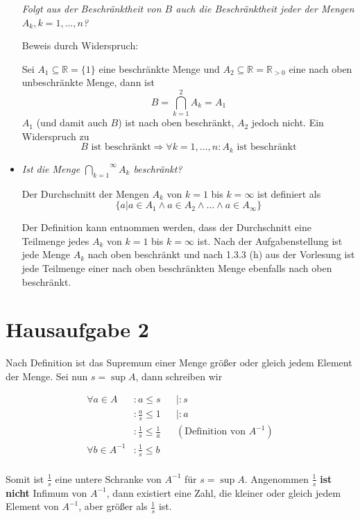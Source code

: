 \documentclass{article}
\begin{document}
\begin{itemize}
  \newpage
  \emph{Folgt aus der Beschränktheit von $B$ auch die Beschränktheit jeder der Mengen $A_k, k = 1, \ldots, n$?}

  Beweis durch Widerspruch:
  
  Sei $A_1 \subseteq \mathbb{R} = \{ 1 \}$ eine beschränkte Menge und $A_2 \subseteq \mathbb{R} = \mathbb{R}_{> 0}$
  eine nach oben unbeschränkte Menge, dann ist
  \[
    B = \bigcap_{k = 1}^{2} A_k = A_1
  \]
  $A_1$ (und damit auch $B$) ist nach oben beschränkt, $A_2$ jedoch nicht. Ein Widerspruch zu
  \[
    B \text{ ist beschränkt} \Rightarrow \forall k = 1, \ldots, n \colon A_k \text{ ist beschränkt}
  \]

\item \emph{Ist die Menge $\overset{\infty}{\underset{k = 1}{\bigcap}} A_k$ beschränkt?}

  Der Durchschnitt der Mengen $A_k$ von $k = 1$ bis $k = \infty$ ist definiert als
  \[
    \{ a | a \in A_1 \land a \in A_2 \land \ldots \land a \in A_\infty \}
  \]

  Der Definition kann entnommen werden, dass der Durchschnitt eine Teilmenge jedes $A_k$ von $k = 1$ bis $k = \infty$
  ist. Nach der Aufgabenstellung ist jede Menge $A_k$ nach oben beschränkt und nach 1.3.3 (h) aus der Vorlesung
  ist jede Teilmenge einer nach oben beschränkten Menge ebenfalls nach oben beschränkt.
  
\end{itemize}

\newpage
\section*{Hausaufgabe 2}

Nach Definition ist das Supremum einer Menge größer oder gleich jedem Element der Menge.
Sei nun $s = \sup A$, dann schreiben wir

\begin{align*}
  \forall a \in A      &\colon a \leq s                     && | : s \\
                       &\colon \frac{a}{s} \leq 1           && | : a \\
                       &\colon \frac{1}{s} \leq \frac{1}{a} && (\text{Definition von $A^{-1}$}) \\
  \forall b \in A^{-1} &\colon \frac{1}{s} \leq b \\
\end{align*}

Somit ist $\frac{1}{s}$ eine untere Schranke von $A^{-1}$ für $s = \sup A$.
Angenommen $\frac{1}{s}$ \textbf{ist nicht} Infimum von $A^{-1}$, dann
existiert eine Zahl, die kleiner oder gleich jedem Element von $A^{-1}$,
aber größer als $\frac{1}{s}$ ist.
\end{document}
